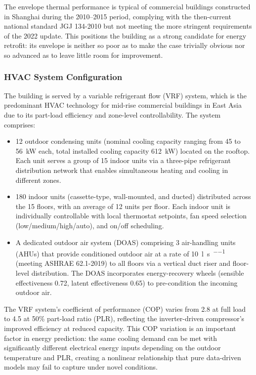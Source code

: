 \documentclass[11pt]{article}
\providecommand{\w}{\watt}
\providecommand{\L}{\litre}
\providecommand{\s}{\second}
\begin{document}
The envelope thermal performance is typical of commercial buildings constructed in Shanghai during the 2010–2015 period, complying with the then-current national standard JGJ 134-2010 but not meeting the more stringent requirements of the 2022 update. This positions the building as a strong candidate for energy retrofit: its envelope is neither so poor as to make the case trivially obvious nor so advanced as to leave little room for improvement.

\subsubsection{HVAC System Configuration}

The building is served by a variable refrigerant flow (VRF) system, which is the predominant HVAC technology for mid-rise commercial buildings in East Asia due to its part-load efficiency and zone-level controllability. The system comprises:

\begin{itemize}[leftmargin=*]
\item 12 outdoor condensing units (nominal cooling capacity ranging from 45 to \SI{56}{\kilo\w} each, total installed cooling capacity \SI{612}{\kilo\w}) located on the rooftop. Each unit serves a group of 15 indoor units via a three-pipe refrigerant distribution network that enables simultaneous heating and cooling in different zones.

\item 180 indoor units (cassette-type, wall-mounted, and ducted) distributed across the 15 floors, with an average of 12 units per floor. Each indoor unit is individually controllable with local thermostat setpoints, fan speed selection (low/medium/high/auto), and on/off scheduling.

\item A dedicated outdoor air system (DOAS) comprising 3 air-handling units (AHUs) that provide conditioned outdoor air at a rate of \SI{10}{\L\per\s\per\person} (meeting ASHRAE 62.1-2019) to all floors via a vertical duct riser and floor-level distribution. The DOAS incorporates energy-recovery wheels (sensible effectiveness 0.72, latent effectiveness 0.65) to pre-condition the incoming outdoor air.
\end{itemize}

The VRF system's coefficient of performance (COP) varies from 2.8 at full load to 4.5 at 50\% part-load ratio (PLR), reflecting the inverter-driven compressor's improved efficiency at reduced capacity. This COP variation is an important factor in energy prediction: the same cooling demand can be met with significantly different electrical energy inputs depending on the outdoor temperature and PLR, creating a nonlinear relationship that pure data-driven models may fail to capture under novel conditions.
\end{document}
